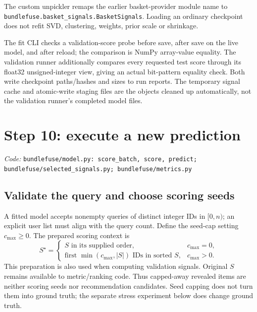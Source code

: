 \documentclass[11pt,a4paper]{article}
\newcommand{\code}[1]{\nolinkurl{#1}}
\newcommand{\src}[1]{\par\begingroup\raggedright\textit{Code: }\code{#1}\par\endgroup}
\numberwithin{equation}{section}
\begin{document}
The custom unpickler remaps the earlier basket-provider module name to
\code{bundlefuse.basket_signals.BasketSignals}. Loading an ordinary checkpoint does not
refit SVD, clustering, weights, prior scale or shrinkage.

The fit CLI checks a validation-score probe before save, after save on the live model,
and after reload; the comparison is NumPy array-value equality. The validation runner
additionally compares every requested test score through its float32 unsigned-integer
view, giving an actual bit-pattern equality check. Both write checkpoint paths/hashes and
sizes to run reports. The temporary signal cache and atomic-write staging files are the
objects cleaned up automatically, not the validation runner's completed model files.

\section{Step 10: execute a new prediction}\label{sec:predict}
\src{bundlefuse/model.py: score_batch, score, predict; bundlefuse/selected_signals.py; bundlefuse/metrics.py}

\subsection{Validate the query and choose scoring seeds}
A fitted model accepts nonempty queries of distinct integer IDs in $[0,n)$; an explicit
user list must align with the query count. Define the seed-cap setting $c_{\max}\ge0$.
The prepared scoring context is
\begin{equation}
 S^\star=\begin{cases}
 S\text{ in its supplied order},&c_{\max}=0,\\
 \text{first }\min(c_{\max},|S|)\text{ IDs in sorted }S,&c_{\max}>0.
 \end{cases}
\end{equation}
This preparation is also used when computing validation signals. Original $S$ remains
available to metric/ranking code. Thus capped-away revealed items are neither scoring
seeds nor recommendation candidates. Seed capping does not turn them into ground truth;
the separate stress experiment below does change ground truth.
\end{document}

